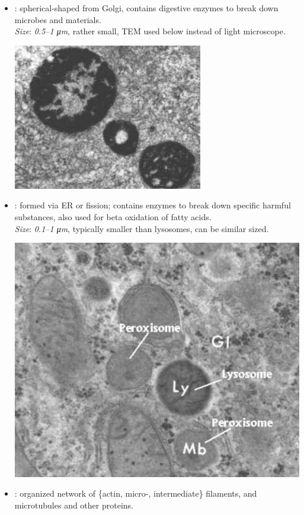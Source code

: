 \begin{multicols}{2}
\begin{itemize}
\begin{center}
  \end{center}
  \item {}: spherical-shaped from Golgi, contains digestive enzymes to break down microbes and materials.\\
  \textit{Size}: \emph{0.5--1 \si{\micro m}}, rather small, TEM used below instead of light microscope.
  \begin{center}
    \hspace{-30pt}\includegraphics[width=0.69\columnwidth]{images/week-1-lysosome.jpg}
  \end{center}
  \item {}: formed via ER or fission; contains enzymes to break down specific harmful substances, also used for beta oxidation of fatty acids. \\
  \textit{Size}: \emph{0.1--1 \si{\micro m}}, typically smaller than lysosomes, can be similar sized.
  \begin{center}
    \hspace{-30pt}\includegraphics[width=0.69\columnwidth]{images/week-1-peroxisome.jpg}
  \end{center}
  \item {}: organized network of \{actin, micro-, intermediate\} filaments, and microtubules and other proteins.\\

\end{itemize}
\end{multicols}
